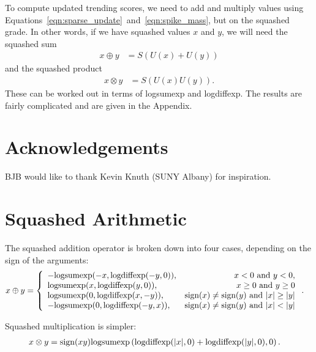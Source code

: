\documentclass[a4paper, 12pt]{article}
\newcommand{\logsumexp}{\textnormal{logsumexp}}
\newcommand{\logdiffexp}{\textnormal{logdiffexp}}
\newcommand{\sign}{\textnormal{sign}}
\begin{document}
To compute updated trending scores, we need to add and multiply
values using Equations~\ref{eqn:sparse_update}~and~\ref{eqn:spike_mass}, but on the
squashed grade. In other words, if we have squashed values $x$ and
$y$, we will need the squashed sum
\begin{align}
x \oplus y &= S(U(x) + U(y))
\end{align}
and the squashed product
\begin{align}
x \otimes y &= S(U(x)U(y)).
\end{align}
These can be worked out in terms of logsumexp and logdiffexp.
The results are fairly complicated and are given in the Appendix.

\section{Acknowledgements}
BJB would like to thank Kevin Knuth (SUNY Albany) for inspiration.




\appendix
\section{Squashed Arithmetic}
The squashed addition operator is broken down into four cases, depending
on the sign of the arguments:
\begin{align}
x \oplus y &= \left\{
    \begin{array}{lr}
   -\logsumexp(-x, \logdiffexp(-y, 0)),& x < 0~\textnormal{and}~y < 0, \\
    \logsumexp(x, \logdiffexp(y, 0)),& x \geq 0~\textnormal{and}~y \geq 0 \\
    \logsumexp(0, \logdiffexp(x, -y)), & \sign(x) \neq \sign(y)~\textnormal{and}~|x| \geq |y|\\
    -\logsumexp(0, \logdiffexp(-y, x)), & \sign(x) \neq \sign(y)~\textnormal{and}~|x| < |y|
    \end{array}
\right. .
\end{align}

Squashed multiplication is simpler:
\begin{align}
x \otimes y &= \sign(xy)
                \logsumexp\left(
                    \logdiffexp(|x|, 0) + \logdiffexp(|y|, 0),
                0\right).
\end{align}
\end{document}
